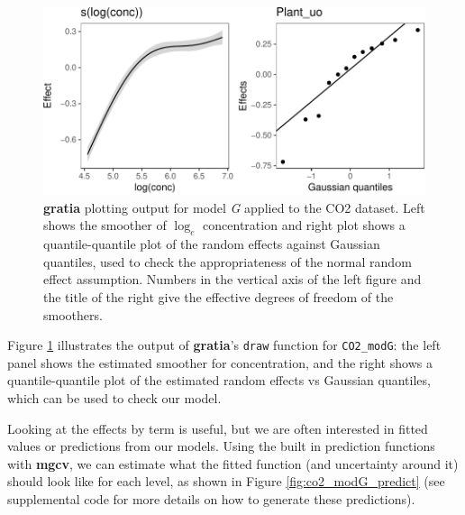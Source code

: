 \documentclass[12pt]{article}
\begin{document}
\begin{figure}
\centering
\includegraphics{../figures/co2_modG-1.pdf}
\caption{\label{fig:co2_modG}\textbf{gratia} plotting output for model
\emph{G} applied to the CO2 dataset. Left shows the smoother of
\(\log_e\) concentration and right plot shows a quantile-quantile plot
of the random effects against Gaussian quantiles, used to check the
appropriateness of the normal random effect assumption. Numbers in the
vertical axis of the left figure and the title of the right give the
effective degrees of freedom of the smoothers.}
\end{figure}

Figure \ref{fig:co2_modG} illustrates the output of \textbf{gratia}'s
\texttt{draw} function for \texttt{CO2\_modG}: the left panel shows the
estimated smoother for concentration, and the right shows a
quantile-quantile plot of the estimated random effects vs Gaussian
quantiles, which can be used to check our model.

Looking at the effects by term is useful, but we are often interested in
fitted values or predictions from our models. Using the built in
prediction functions with \textbf{mgcv}, we can estimate what the fitted
function (and uncertainty around it) should look like for each level, as
shown in Figure \ref{fig:co2_modG_predict} (see supplemental code for
more details on how to generate these predictions).
\end{document}
